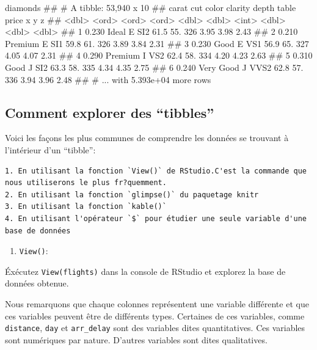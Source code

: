 \documentclass[]{book}
\newenvironment{Shaded}{\begin{snugshade}}{\end{snugshade}}
\newcommand{\NormalTok}[1]{#1}
\providecommand{\tightlist}{%
  \setlength{\itemsep}{0pt}\setlength{\parskip}{0pt}}
\theoremstyle{definition}
\theoremstyle{definition}
\theoremstyle{definition}
\theoremstyle{remark}
\begin{document}
\begin{Shaded}
\begin{Highlighting}[]
\NormalTok{diamonds}
\NormalTok{## # A tibble: 53,940 x 10}
\NormalTok{##   carat cut       color clarity depth table price     x     y     z}
\NormalTok{##   <dbl> <ord>     <ord> <ord>   <dbl> <dbl> <int> <dbl> <dbl> <dbl>}
\NormalTok{## 1 0.230 Ideal     E     SI2      61.5   55.   326  3.95  3.98  2.43}
\NormalTok{## 2 0.210 Premium   E     SI1      59.8   61.   326  3.89  3.84  2.31}
\NormalTok{## 3 0.230 Good      E     VS1      56.9   65.   327  4.05  4.07  2.31}
\NormalTok{## 4 0.290 Premium   I     VS2      62.4   58.   334  4.20  4.23  2.63}
\NormalTok{## 5 0.310 Good      J     SI2      63.3   58.   335  4.34  4.35  2.75}
\NormalTok{## 6 0.240 Very Good J     VVS2     62.8   57.   336  3.94  3.96  2.48}
\NormalTok{## # ... with 5.393e+04 more rows}
\end{Highlighting}
\end{Shaded}

\hypertarget{explorertibbles}{%
\subsection{Comment explorer des ``tibbles''}\label{explorertibbles}}

Voici les façons les plus communes de comprendre les données se trouvant
à l'intérieur d'un ``tibble'':

\begin{verbatim}
1. En utilisant la fonction `View()` de RStudio.C'est la commande que nous utiliserons le plus fr?quemment.
2. En utilisant la fonction `glimpse()` du paquetage knitr
3. En utilisant la fonction `kable()`
4. En utilisant l'opérateur `$` pour étudier une seule variable d'une base de données
\end{verbatim}

\begin{enumerate}
\def\labelenumi{\arabic{enumi}.}
\tightlist
\item
  \texttt{View()}:
\end{enumerate}

Éxécutez \texttt{View(flights)} dans la console de RStudio et explorez
la base de données obtenue.

Nous remarquons que chaque colonnes représentent une variable différente
et que ces variables peuvent être de différents types. Certaines de ces
variables, comme \texttt{distance}, \texttt{day} et \texttt{arr\_delay}
sont des variables dites quantitatives. Ces variables sont numériques
par nature. D'autres variables sont dites qualitatives.
\end{document}
